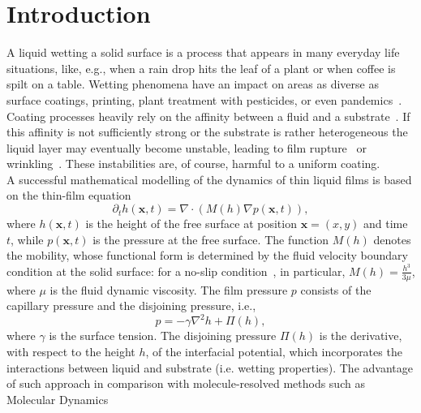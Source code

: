 \section{Introduction}\label{sec:intro}
A liquid wetting a solid surface is a process that appears in many everyday life situations, like, e.g., when a rain drop hits the leaf of a plant or when coffee is spilt on a table.
Wetting phenomena have an impact on areas as diverse as surface coatings, printing, plant treatment with pesticides, or even pandemics~\cite{oronLongscaleEvolutionThin1997, doi:10.1146/annurev-fluid-011212-140734, cassieWettabilityPorousSurfaces1944, Lenormand_1990,DERYCK1998278, doi:10.1146/annurev.fluid.31.1.347,BergeronNature,BhardwajPoF2020}.
Coating processes heavily rely on the affinity between a fluid and a substrate~\cite{bonnWettingSpreading2009}.
If this affinity is not sufficiently strong or the substrate is rather heterogeneous the liquid layer may eventually become unstable,
leading to film rupture~\cite{oronLongscaleEvolutionThin1997, crasterDynamicsStabilityThin2009} or wrinkling~\cite{dasilvasobrinhoStudyDefectsUltrathin1999}. 
These instabilities are, of course, harmful to a uniform coating.\\ 
A successful mathematical modelling of the dynamics of thin liquid films is based on the thin-film equation~\cite{Reynolds, oronLongscaleEvolutionThin1997}
\begin{equation}\label{eq:thin_film}
    \partial_t h(\mathbf{x},t) = \nabla\cdot\left(M(h)\nabla p(\mathbf{x},t)\right),
\end{equation}
where $h(\mathbf{x},t)$ is the height of the free surface at position $\mathbf{x} = (x,y)$ and time $t$, while $p(\mathbf{x},t)$ is the pressure at the free surface.
The function $M(h)$ denotes the mobility, whose
functional form is determined by the fluid velocity boundary condition at 
the solid surface: for a no-slip condition~\cite{oronLongscaleEvolutionThin1997}, in particular, $M(h)=\frac{h^3}{3\mu}$, where $\mu$ is the fluid dynamic viscosity.
The film pressure $p$ consists of the capillary pressure and the disjoining pressure, i.e.,
\begin{equation}\label{eq:pressure}
    p = - \gamma\nabla^2 h + \Pi(h),
\end{equation}
where $\gamma$ is the surface tension. The disjoining pressure
$\Pi(h)$ is the derivative, with respect to the height $h$, of the interfacial potential,
which incorporates the interactions between liquid and substrate (i.e. wetting properties).
The advantage of such approach in comparison with molecule-resolved methods such as Molecular Dynamics~\cite{haile1992molecular, zhangMolecularSimulationThin2019, doi:10.1063/1.1290698, grabow1988thin}
